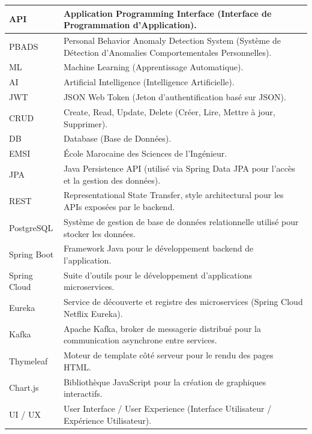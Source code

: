 \begin{center}
\begin{longtable}{|p{3.5cm}|p{11.5cm}|}
        API & Application Programming Interface (Interface de Programmation d'Application). \\
        \hline
        PBADS & Personal Behavior Anomaly Detection System (Système de Détection d'Anomalies Comportementales Personnelles). \\
        \hline
        ML & Machine Learning (Apprentissage Automatique). \\
        \hline
        AI & Artificial Intelligence (Intelligence Artificielle). \\
        \hline
        JWT & JSON Web Token (Jeton d'authentification basé sur JSON). \\
        \hline
        CRUD & Create, Read, Update, Delete (Créer, Lire, Mettre à jour, Supprimer). \\
        \hline
        DB & Database (Base de Données). \\
        \hline
        EMSI & École Marocaine des Sciences de l'Ingénieur. \\
        \hline
        JPA & Java Persistence API (utilisé via Spring Data JPA pour l'accès et la gestion des données). \\
        \hline
        REST & Representational State Transfer, style architectural pour les APIs exposées par le backend. \\
        \hline
        PostgreSQL & Système de gestion de base de données relationnelle utilisé pour stocker les données. \\
        \hline
        Spring Boot & Framework Java pour le développement backend de l'application. \\
        \hline
        Spring Cloud & Suite d'outils pour le développement d'applications microservices. \\
        \hline
        Eureka & Service de découverte et registre des microservices (Spring Cloud Netflix Eureka). \\
        \hline
        Kafka & Apache Kafka, broker de messagerie distribué pour la communication asynchrone entre services. \\
        \hline
        Thymeleaf & Moteur de template côté serveur pour le rendu des pages HTML. \\
        \hline
        Chart.js & Bibliothèque JavaScript pour la création de graphiques interactifs. \\
        \hline
        UI / UX & User Interface / User Experience (Interface Utilisateur / Expérience Utilisateur). \\

\end{longtable}
\end{center}
